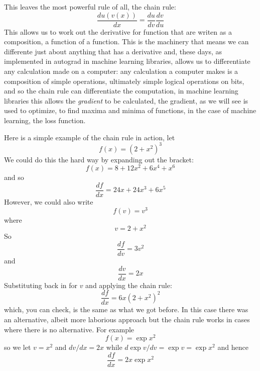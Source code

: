 \documentclass[12pt]{article}
\begin{document}
This leaves the most powerful rule of all, the chain rule:
\begin{equation}
  \frac{du(v(x))}{dx}=\frac{du}{dv}\frac{dv}{du}
\end{equation}
This allows us to work out the derivative for function that are writen
as a composition, a function of a function. This is the machinery that
means we can differente just about anything that has a derivative and,
these days, as implemented in autograd in machine learning libraries,
allows us to differentiate any calculation made on a computer: any
calculation a computer makes is a composition of simple operations,
ultimately simple logical operations on bits, and so the chain rule
can differentiate the computation, in machine learning libraries this
allows the \textsl{gradient} to be calculated, the gradient, as we
will see is used to optimize, to find maxima and minima of functions,
in the case of machine learning, the loss function.

Here is a simple example of the chain rule in action, let
\begin{equation}
  f(x)=(2+x^2)^3
\end{equation}
We could do this the hard way by expanding out the bracket:
\begin{equation}
  f(x)=8+12x^2+6x^4+x^6
\end{equation}
and so
\begin{equation}
  \frac{df}{dx}=24x+24x^3+6x^5
\end{equation}
However, we could also write
\begin{equation}
  f(v)=v^3
\end{equation}
where
\begin{equation}
  v=2+x^2
\end{equation}
So
\begin{equation}
  \frac{df}{dv}=3v^2
\end{equation}
and
\begin{equation}
  \frac{dv}{dx}=2x
\end{equation}
Substituting back in for $v$ and applying the chain rule:
\begin{equation}
  \frac{df}{dx}=6x(2+x^2)^2
\end{equation}
which, you can check, is the same as what we got before. In this case
there was an alternative, albeit more laborious approach but the chain rule works in cases where there is no alternative. For example
\begin{equation}
  f(x)=\exp{x^2}
\end{equation}
so we let $v=x^2$ and $dv/dx=2x$ while $d\exp{v}/dv=\exp{v}=\exp{x^2}$ and hence
\begin{equation}
  \frac{df}{dx}=2x\exp{x^2}
\end{equation}
\end{document}
